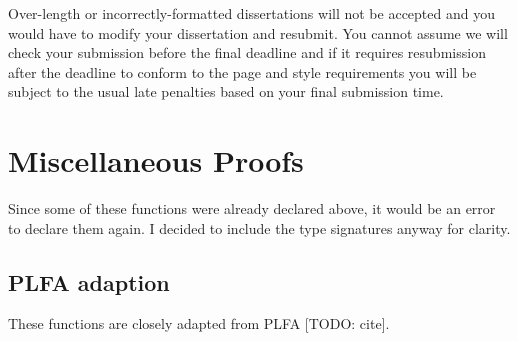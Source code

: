 \documentclass[logo,bsc,singlespacing,parskip,online]{infthesis}
\begin{document}
Over-length or incorrectly-formatted dissertations will not be accepted and you
would have to modify your dissertation and resubmit. You cannot assume we will
check your submission before the final deadline and if it requires resubmission
after the deadline to conform to the page and style requirements you will be
subject to the usual late penalties based on your final submission time.





\appendix

\chapter{Miscellaneous Proofs}
\label{appendix:misc_proofs}

Since some of these functions were already declared above, it would be an error to declare them
again. I decided to include the type signatures anyway for clarity.

\section{PLFA adaption}

These functions are closely adapted from PLFA [TODO: cite].
\end{document}
